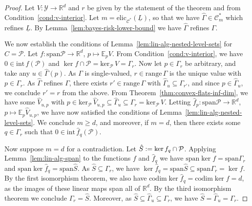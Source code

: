 \documentclass[11pt]{article} %
\newcommand{\Comments}{1}
\newcommand{\mytodo}[2]{\ifnum\Comments=1%
	\todo[linecolor=#1!80!black,backgroundcolor=#1,bordercolor=#1!80!black]{#2}\fi}
\newcommand{\btw}[1]{}%
\newcommand{\reals}{\mathbb{R}}
\newcommand{\interior}{\mathrm{int}\,}
\newcommand{\elic}{\mathrm{elic}}
\newcommand{\spn}{\mathrm{span}}
\newcommand{\range}{\mathrm{range}\,}
\newcommand{\zeros}[1]{\mathrm{ker}_\P\,#1}
\newcommand{\codim}{\mathrm{codim}}
\newcommand{\C}{\mathcal{C}}
\newcommand{\E}{\mathbb{E}}
\renewcommand{\P}{\mathcal{P}}
\newcommand{\Y}{\mathcal{Y}}
\newcommand{\lbar}{\underline{L}} %
\newtheorem{theorem}{Theorem}
\begin{document}
\bayesrisklowerbound*
\begin{proof}
  Let $V:\Y\to\reals^d$ and $r$ be given by the statement of the theorem and from Condition~\ref{cond:v-interior}.
  Let $m = \elic_{\C^*}(\lbar)$, so that we have $\hat\Gamma\in\C^*_m$ which refines $\lbar$.
  By Lemma~\ref{lem:bayes-risk-lower-bound} we have $\hat\Gamma$ refines $\Gamma$.

  \btw{Notes to self about the proof commented out here}

  We now establish the conditions of Lemma~\ref{lem:lin-alg-nested-level-sets} for $C=\P$.
  Let $f:\spn \P \to \reals^d$, $p \mapsto \E_pV$.
  From Condition~\ref{cond:v-interior}, we have $0\in\interior f(\P)$ and $\ker f \cap \P = \zeros{V} = \Gamma_r$.
  Now let $p\in\Gamma_r$ be arbitrary, and take any $u\in\hat\Gamma(p)$.
  As $\Gamma$ is single-valued, $r\in\range\Gamma$ is the unique value with $p\in\Gamma_r$.
  As $\hat\Gamma$ refines $\Gamma$, there exists $r'\in\range\Gamma$ with $\hat\Gamma_u \subseteq \Gamma_{r'}$, and since $p\in\hat\Gamma_u$, we conclude $r'=r$ from the above.
  From Theorem~\ref{thm:convex-flats-inf-dim}, we have some $\hat V_{u,p}$ with $p\in\zeros{\hat V_{u,p}} \subseteq \hat\Gamma_u \subseteq \Gamma_r = \zeros{V}$.
  Letting $\hat f_p:\spn \P \to \reals^d$, $p \mapsto \E_p\hat V_{u,p}$, we have now satisfied the conditions of Lemma~\ref{lem:lin-alg-nested-level-sets}.
  We conclude $m \geq d$, and moreover, if $m=d$, then there exists some $q\in\Gamma_r$ such that $0 \in\interior\hat f_q(\P)$.
    
  Now suppose $m = d$ for a contradiction.
  Let $\hat S\defeq \ker f_q\cap \P$.
  Applying Lemma~\ref{lem:lin-alg-span} to the functions $f$ and $\hat f_q$
  we have $\spn \ker f = \spn \Gamma_r$ and $\spn \ker \hat f_q = \spn \hat S$.
  As $\hat S \subseteq \Gamma_r$, we have $\ker \hat f_q = \spn \hat S \subseteq \spn \Gamma_r = \ker f$.
  By the first isomorphism theorem, we also have $\codim \ker \hat f_q = \codim \ker f = d$, as the images of these linear maps span all of $\reals^d$.
  By the third isomorphism theorem we conclude $\Gamma_r = \hat S$.
  Moreover, as $\hat S \subseteq \hat\Gamma_u \subseteq \Gamma_r$, we have $\hat S = \hat\Gamma_u = \Gamma_r$.


\end{proof}
\end{document}
